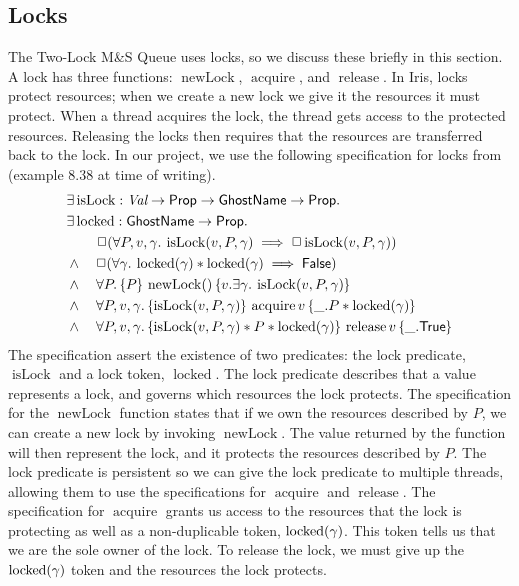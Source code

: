 \documentclass[a4paper, 10pt]{report}
\theoremstyle{definition}
\newcommand{\isLock}{\operatorname{isLock}}
\newcommand{\locked}{\operatorname{locked}}
\newcommand{\newLock}{\operatorname{newLock}}
\newcommand{\acquire}{\operatorname{acquire}}
\newcommand{\release}{\operatorname{release}}
\newcommand{\msq}{M\&S Queue}
\newcommand{\tlmsq}{Two-Lock \msq{}}
\begin{document}
\subsection{Locks}\label{Pre:iris:locks}

The \tlmsq{} uses locks, so we discuss these briefly in this section. A lock has three functions: $\newLock$, $\acquire$, and $\release$. In Iris, locks protect resources; when we create a new lock we give it the resources it must protect. When a thread acquires the lock, the thread gets access to the protected resources. Releasing the locks then requires that the resources are transferred back to the lock. In our project, we use the following specification for locks from \citet{gentleiris} (example 8.38 at time of writing).
\begin{align*}
  &\Exists \isLock : \Val \to \Prop \to \textlog{GhostName} \to \Prop.\nonumber\\
  &\Exists \locked : \textlog{GhostName} \to \Prop.\nonumber\\
  &\quad\quad\persistently(\All P, v, \gamma. \isLock(v,P,\gamma) \implies \persistently \isLock(v,P,\gamma))\\
  &\land\quad\persistently(\All \gamma. \locked(\gamma) \ast \locked(\gamma) \implies \FALSE)\\
  &\land\quad\All P.\hoare{P}{\newLock ()}{v.\Exists \gamma.\isLock(v,P,\gamma)}\\
  &\land\quad\All P, v, \gamma.\hoare{\isLock(v,P,\gamma)}{\acquire v}{\_.P \ast \locked(\gamma)}\\
  &\land\quad\All P, v, \gamma.\hoare{\isLock(v,P,\gamma) \ast P \ast \locked(\gamma)}{\release v}{\_.\TRUE}
\end{align*}
The specification assert the existence of two predicates: the lock predicate, $\isLock$ and a lock token, $\locked$. The lock predicate describes that a value represents a lock, and governs which resources the lock protects. The specification for the $\newLock$ function states that if we own the resources described by $P$, we can create a new lock by invoking $\newLock$. The value returned by the function will then represent the lock, and it protects the resources described by $P$. The lock predicate is persistent so we can give the lock predicate to multiple threads, allowing them to use the specifications for $\acquire$ and $\release$. The specification for $\acquire$ grants us access to the resources that the lock is protecting as well as a non-duplicable token, $\locked(\gname)$. This token tells us that we are the sole owner of the lock. To release the lock, we must give up the $\locked(\gname)$ token and the resources the lock protects.
\end{document}
